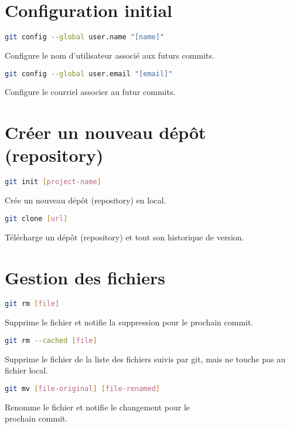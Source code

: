 \documentclass[10pt,landscape]{article}
\begin{document}
\raggedright
\footnotesize
\begin{multicols*}{3}


\setlength{\premulticols}{1pt}
\setlength{\postmulticols}{1pt}
\setlength{\multicolsep}{1pt}
\setlength{\columnsep}{2pt}

\section{Configuration initial}
\begin{lstlisting}[language=bash]
git config --global user.name "[name]"
\end{lstlisting}
Configure le nom d’utilisateur associé aux futurs commits.
\begin{lstlisting}[language=bash]
git config --global user.email "[email]"
\end{lstlisting}
Configure le courriel associer au futur commits.


\section{Créer un nouveau dépôt (repository)}
\begin{lstlisting}[language=bash]
git init [project-name]
\end{lstlisting}
Crée un nouveau dépôt (repository) en local.\\
\begin{lstlisting}[language=bash]
git clone [url]
\end{lstlisting}
Télécharge un dépôt (repository) et tout son historique de version.


\section{Gestion des fichiers}
\begin{lstlisting}[language=bash]
git rm [file]
\end{lstlisting}
Supprime le fichier et notifie la suppression pour le prochain commit.\\
\begin{lstlisting}[language=bash]
git rm --cached [file]
\end{lstlisting}
Supprime le fichier de la liste des fichiers suivis par git, mais ne touche pas au fichier local.\\
\begin{lstlisting}[language=bash]
git mv [file-original] [file-renamed]
\end{lstlisting}
Renomme le fichier et notifie le changement pour le\\
prochain commit.


\end{multicols*}
\end{document}
